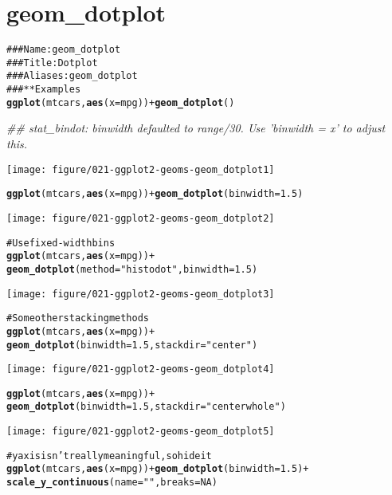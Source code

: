 \documentclass[a4paper,titlepage]{tufte-handout}\usepackage{graphicx, color}
\makeatletter
\def\maxwidth{ %
  \ifdim\Gin@nat@width>\linewidth
    \linewidth
  \else
    \Gin@nat@width
  \fi
}
\newcommand{\hlfunctioncall}[1]{\textcolor[rgb]{0.501960784313725,0,0.329411764705882}{\textbf{#1}}}%
\newcommand{\hlstring}[1]{\textcolor[rgb]{0.6,0.6,1}{#1}}%
\newcommand{\hlcomment}[1]{\textcolor[rgb]{0.180392156862745,0.6,0.341176470588235}{#1}}%
\newenvironment{kframe}{%
 \def\at@end@of@kframe{}%
 \ifinner\ifhmode%
  \def\at@end@of@kframe{\end{minipage}}%
  \begin{minipage}{\columnwidth}%
 \fi\fi%
 \def\FrameCommand##1{\hskip\@totalleftmargin \hskip-\fboxsep
 \colorbox{shadecolor}{##1}\hskip-\fboxsep
     \hskip-\linewidth \hskip-\@totalleftmargin \hskip\columnwidth}%
 \MakeFramed {\advance\hsize-\width
   \@totalleftmargin\z@ \linewidth\hsize
   \@setminipage}}%
 {\par\unskip\endMakeFramed%
 \at@end@of@kframe}
\newenvironment{knitrout}{}{} %
\makeatother
\begin{document}
\section{geom\_dotplot}

\begin{knitrout}
\color{fgcolor}\begin{kframe}
\begin{alltt}
\hlcomment{### Name: geom_dotplot}
\hlcomment{### Title: Dot plot}
\hlcomment{### Aliases: geom_dotplot}
\hlcomment{### ** Examples}
\hlfunctioncall{ggplot}(mtcars, \hlfunctioncall{aes}(x = mpg)) + \hlfunctioncall{geom_dotplot}()
\end{alltt}


{\ttfamily\noindent\itshape\textcolor{messagecolor}{\#\# stat\_bindot: binwidth defaulted to range/30. Use 'binwidth = x' to adjust this.}}\end{kframe}\texttt{[image: figure/021-ggplot2-geoms-geom\_dotplot1]} \begin{kframe}\begin{alltt}
\hlfunctioncall{ggplot}(mtcars, \hlfunctioncall{aes}(x = mpg)) + \hlfunctioncall{geom_dotplot}(binwidth = 1.5)
\end{alltt}
\end{kframe}\texttt{[image: figure/021-ggplot2-geoms-geom\_dotplot2]} \begin{kframe}\begin{alltt}
\hlcomment{# Use fixed-width bins}
\hlfunctioncall{ggplot}(mtcars, \hlfunctioncall{aes}(x = mpg)) +
  \hlfunctioncall{geom_dotplot}(method=\hlstring{"histodot"}, binwidth = 1.5)
\end{alltt}
\end{kframe}\texttt{[image: figure/021-ggplot2-geoms-geom\_dotplot3]} \begin{kframe}\begin{alltt}
\hlcomment{# Some other stacking methods}
\hlfunctioncall{ggplot}(mtcars, \hlfunctioncall{aes}(x = mpg)) +
  \hlfunctioncall{geom_dotplot}(binwidth = 1.5, stackdir = \hlstring{"center"})
\end{alltt}
\end{kframe}\texttt{[image: figure/021-ggplot2-geoms-geom\_dotplot4]} \begin{kframe}\begin{alltt}
\hlfunctioncall{ggplot}(mtcars, \hlfunctioncall{aes}(x = mpg)) +
  \hlfunctioncall{geom_dotplot}(binwidth = 1.5, stackdir = \hlstring{"centerwhole"})
\end{alltt}
\end{kframe}\texttt{[image: figure/021-ggplot2-geoms-geom\_dotplot5]} \begin{kframe}\begin{alltt}
\hlcomment{# y axis isn't really meaningful, so hide it}
\hlfunctioncall{ggplot}(mtcars, \hlfunctioncall{aes}(x = mpg)) + \hlfunctioncall{geom_dotplot}(binwidth = 1.5) +
  \hlfunctioncall{scale_y_continuous}(name = \hlstring{""}, breaks = NA)
\end{alltt}



\end{kframe}
\end{knitrout}
\end{document}
